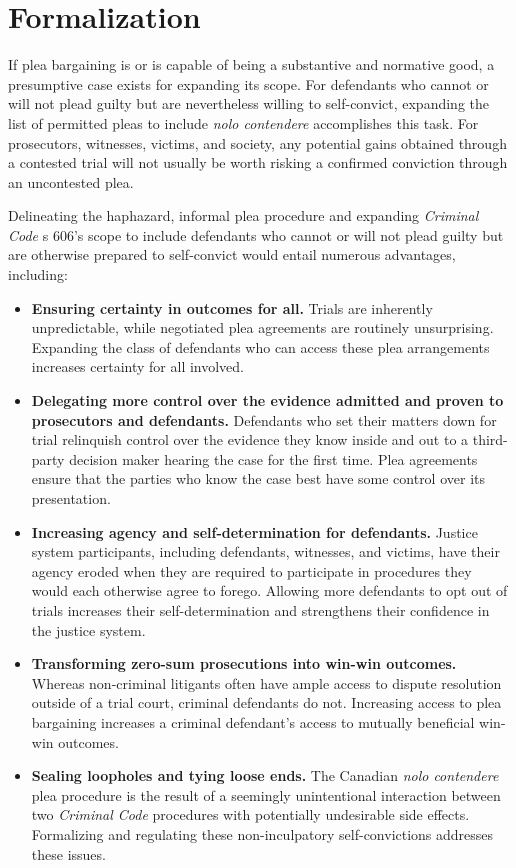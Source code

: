 \section{Formalization}

If plea bargaining is or is capable of being a substantive and normative good, a presumptive case exists for expanding its scope. For defendants who cannot or will not plead guilty but are nevertheless willing to self-convict, expanding the list of permitted pleas to include \textit{nolo contendere} accomplishes this task. For prosecutors, witnesses, victims, and society, any potential gains obtained through a contested trial will not usually be worth risking a confirmed conviction through an uncontested plea.

Delineating the haphazard, informal plea procedure and expanding \textit{Criminal Code} s 606's scope to include defendants who cannot or will not plead guilty but are otherwise prepared to self-convict would entail numerous advantages, including:

\begin{itemize}
    \item \textbf{Ensuring certainty in outcomes for all.} Trials are inherently unpredictable, while negotiated plea agreements are routinely unsurprising. Expanding the class of defendants who can access these plea arrangements increases certainty for all involved.
    \item \textbf{Delegating more control over the evidence admitted and proven to prosecutors and defendants.} Defendants who set their matters down for trial relinquish control over the evidence they know inside and out to a third-party decision maker hearing the case for the first time. Plea agreements ensure that the parties who know the case best have some control over its presentation.
    \item \textbf{Increasing agency and self-determination for defendants.} Justice system participants, including defendants, witnesses, and victims, have their agency eroded when they are required to participate in procedures they would each otherwise agree to forego. Allowing more defendants to opt out of trials increases their self-determination and strengthens their confidence in the justice system.
    \item \textbf{Transforming zero-sum prosecutions into win-win outcomes.} Whereas non-criminal litigants often have ample access to dispute resolution outside of a trial court, criminal defendants do not. Increasing access to plea bargaining increases a criminal defendant's access to mutually beneficial win-win outcomes. 
    \item \textbf{Sealing loopholes and tying loose ends.} The Canadian \textit{nolo contendere} plea procedure is the result of a seemingly unintentional interaction between two \textit{Criminal Code} procedures with potentially undesirable side effects. Formalizing and regulating these non-inculpatory self-convictions addresses these issues.
\end{itemize}


